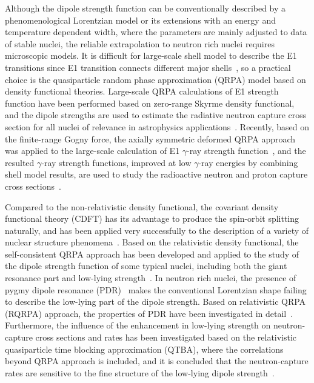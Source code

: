 \documentclass[prc,twocolumn,twoside,showpacs,superscriptaddress,floatfix]{revtex4-1}
\begin{document}
Although the dipole strength function can be conventionally described by a
phenomenological Lorentzian model or its extensions with an energy and
temperature dependent width\cite{Capote2009, Nucl_Data_Sheets_110_3107}, where
the parameters are mainly adjusted to data of stable nuclei, the reliable
extrapolation to neutron rich nuclei requires microscopic models.
It is
difficult for large-scale shell model to describe the E1 transitions since E1
transition connects different major shells~\cite{Placeholder:08}, so a
practical choice is the quasiparticle random phase approximation (QRPA) model
based on density functional theories.
Large-scale QRPA calculations of E1
strength function have been performed based on zero-range Skyrme density
functional, and the dipole strengths are used to estimate the radiative neutron
capture cross section for all nuclei of relevance in astrophysics applications~\cite{Goriely2002, Goriely2004}.
Recently, based on the finite-range Gogny
force, the axially symmetric deformed QRPA approach was applied to the
large-scale calculation of E1 $\gamma$-ray strength function~\cite{Martini2016}, and the resulted $\gamma$-ray strength functions, improved
at low $\gamma$-ray energies by combining shell model results, are used to
study the radioactive neutron and proton capture cross sections~\cite{Goriely2018}.

Compared to the non-relativistic density functional, the covariant density
functional theory (CDFT) has its advantage to produce the spin-orbit splitting
naturally, and has been applied very successfully to the description of a
variety of nuclear structure phenomena~\cite{Placeholder:09}.
Based on the
relativistic density functional, the self-consistent QRPA approach has been
developed and applied to the study of the dipole strength function of some
typical nuclei, including both the giant resonance part and low-lying strength~\cite{Paar2003}.
In neutron rich nuclei, the presence of pygmy dipole resonance
(PDR)~\cite{Paar2007} makes the conventional Lorentzian shape failing to
describe the low-lying part of the dipole strength.
Based on relativistic QRPA
(RQRPA) approach, the properties of PDR have been investigated in detail~\cite{Niu, Vretenar}.
Furthermore, the influence of the enhancement in
low-lying strength on neutron-capture cross sections and rates has been
investigated based on the relativistic quasiparticle time blocking
approximation (QTBA), where the correlations beyond QRPA approach is included,
and it is concluded that the neutron-capture rates are sensitive to the fine
structure of the low-lying dipole strength~\cite{Litvinova_2009}.
\end{document}
